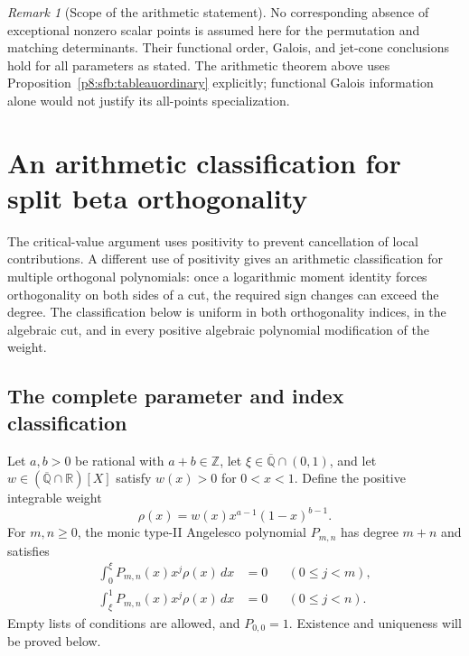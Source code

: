 \documentclass[11pt,a4paper]{article}
\theoremstyle{definition}
\theoremstyle{remark}
\newtheorem{remark}[theorem]{Remark}
\numberwithin{equation}{section}
\begin{document}
\begin{remark}[Scope of the arithmetic statement]
No corresponding absence of exceptional nonzero scalar points
is assumed here for the permutation and matching determinants.
Their functional order, Galois, and jet-cone conclusions hold
for all parameters as stated.  The arithmetic theorem above
uses Proposition~\ref{p8:sfb:tableauordinary} explicitly;
functional Galois information alone would not justify its
all-points specialization.
\end{remark}


\clearpage

\section{An arithmetic classification for split beta orthogonality}
\label{p8:aa:section}

The critical-value argument uses positivity to prevent cancellation of
local contributions. A different use of positivity gives an arithmetic
classification for multiple orthogonal polynomials: once a logarithmic
moment identity forces orthogonality on both sides of a cut, the required
sign changes can exceed the degree. The classification below is uniform
in both orthogonality indices, in the algebraic cut, and in every positive
algebraic polynomial modification of the weight.

\subsection{The complete parameter and index classification}

Let $a,b>0$ be rational with $a+b\in\mathbb Z$, let
$\xi\in\overline{\mathbb Q}\cap(0,1)$, and let
$w\in(\overline{\mathbb Q}\cap\mathbb R)[X]$ satisfy
$w(x)>0$ for $0<x<1$. Define the positive integrable weight
\[
 \rho(x)=w(x)x^{a-1}(1-x)^{b-1}.
\]
For $m,n\ge0$, the monic type-II Angelesco polynomial
$P_{m,n}$ has degree $m+n$ and satisfies
\begin{align}
 \int_0^\xi P_{m,n}(x)x^j\rho(x)\,dx&=0
       &&(0\le j<m),\label{p8:aa:left}\\
 \int_\xi^1 P_{m,n}(x)x^j\rho(x)\,dx&=0
       &&(0\le j<n).\label{p8:aa:right}
\end{align}
Empty lists of conditions are allowed, and $P_{0,0}=1$.
Existence and uniqueness will be proved below.
\end{document}
